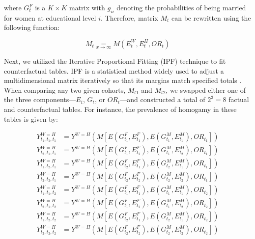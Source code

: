 where $G_{t}^{F}$ is a $K \times K$ matrix with $g_{ii}$ denoting the probabilities of being married for women at educational level $i$. Therefore, matrix $M_{t}$ can be rewritten using the following function:

\begin{equation}
    M_{t} \underset{x \to \infty}= M(E_{t}^{W}, E_{t}^{H}, OR_{t})
\end{equation}

Next, we utilized the Iterative Proportional Fitting (IPF) technique to fit counterfactual tables. IPF is a statistical method widely used to adjust a multidimensional matrix iteratively so that its margins match specified totals \parencite{demingLeastSquaresAdjustment1940}. When comparing any two given cohorts, $M_{t1}$ and $M_{t2}$, we swapped either one of the three components—$E_{t}$, $G_{t}$, or $OR_{t}$—and constructed a total of $2^3=8$ factual and counterfactual tables. For instance, the prevalence of homogamy in these tables is given by:

\begin{align}
    Y^{W=H}_{t_{1}, t_{1}, t_{1}} & = Y^{W=H}(M[E(G^{F}_{t_{1}}, E^{F}_{t_{1}}), E(G^{M}_{t_{1}}, E^{M}_{t_{1}}), OR_{t_{1}}]) \nonumber \\[10pt]
    Y^{W=H}_{t_{2}, t_{1}, t_{1}} & = Y^{W=H}(M[E(G^{F}_{t_{1}}, E^{F}_{t_{2}}), E(G^{M}_{t_{1}}, E^{M}_{t_{2}}), OR_{t_{1}}]) \nonumber \\[10pt]
    Y^{W=H}_{t_{1}, t_{2}, t_{1}} & = Y^{W=H}(M[E(G^{F}_{t_{2}}, E^{F}_{t_{1}}), E(G^{M}_{t_{2}}, E^{M}_{t_{1}}), OR_{t_{1}}]) \nonumber \\[10pt]
    Y^{W=H}_{t_{2}, t_{2}, t_{1}} & = Y^{W=H}(M[E(G^{F}_{t_{2}}, E^{F}_{t_{2}}), E(G^{M}_{t_{2}}, E^{M}_{t_{2}}), OR_{t_{1}}]) \nonumber \\[10pt]
    Y^{W=H}_{t_{1}, t_{1}, t_{2}} & = Y^{W=H}(M[E(G^{F}_{t_{1}}, E^{F}_{t_{1}}), E(G^{M}_{t_{1}}, E^{M}_{t_{1}}), OR_{t_{2}}]) \nonumber \\[10pt]
    Y^{W=H}_{t_{2}, t_{1}, t_{2}} & = Y^{W=H}(M[E(G^{F}_{t_{1}}, E^{F}_{t_{2}}), E(G^{M}_{t_{1}}, E^{M}_{t_{2}}), OR_{t_{2}}]) \nonumber \\[10pt]
    Y^{W=H}_{t_{1}, t_{2}, t_{2}} & = Y^{W=H}(M[E(G^{F}_{t_{2}}, E^{F}_{t_{1}}), E(G^{M}_{t_{2}}, E^{M}_{t_{1}}), OR_{t_{2}}]) \nonumber \\[10pt]
    Y^{W=H}_{t_{2}, t_{2}, t_{2}} & = Y^{W=H}(M[E(G^{F}_{t_{2}}, E^{F}_{t_{2}}), E(G^{M}_{t_{2}}, E^{M}_{t_{2}}), OR_{t_{2}}])
\end{align}

